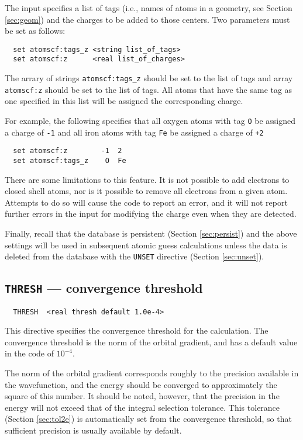 The input specifies a list of tags (i.e., names of atoms in a
geometry, see Section \ref{sec:geom}) and the charges to be added to
those centers.  Two parameters must be set as follows:
\begin{verbatim}
  set atomscf:tags_z <string list_of_tags>
  set atomscf:z      <real list_of_charges>
\end{verbatim}

The arrary of strings \verb+atomscf:tags_z+ should be set to the list
of tags and array \verb+atomscf:z+ should be set to the list of tags.
All atoms that have the same tag as one specified in this list will be
assigned the corresponding charge.

For example, the following specifies that all oxygen atoms with tag
\verb+O+ be assigned a charge of \verb+-1+ and all iron atoms with tag
\verb+Fe+ be assigned a charge of \verb=+2=
\begin{verbatim}
  set atomscf:z        -1  2
  set atomscf:tags_z    O  Fe
\end{verbatim}

There are some limitations to this feature.  It is not possible to add
electrons to closed shell atoms, nor is it possible to remove all
electrons from a given atom.  Attempts to do so will cause the code to
report an error, and it will not report further errors in the input
for modifying the charge even when they are detected.

Finally, recall that the database is persistent (Section
\ref{sec:persist}) and the above settings will be used in subsequent
atomic guess calculations unless the data is deleted from the database
with the \verb+UNSET+ directive (Section \ref{sec:unset}).


\subsection{{\tt THRESH} --- convergence threshold}
\label{sec:thresh}

\begin{verbatim}
  THRESH  <real thresh default 1.0e-4>
\end{verbatim}

This directive specifies the convergence threshold for the
calculation.  The convergence threshold is the norm of the orbital
gradient, and has a default value in the code of $10^{-4}$.

The norm of the orbital gradient corresponds roughly to the precision
available in the wavefunction, and the energy should be converged to
approximately the square of this number.  It should be noted, however,
that the precision in the energy will not exceed that of the integral
selection tolerance.  This tolerance (Section \ref{sec:tol2e}) is
automatically set from the convergence threshold, so that sufficient
precision is usually available by default.


